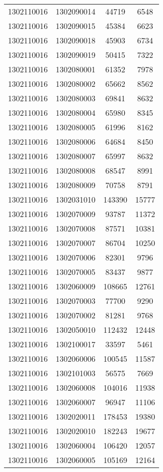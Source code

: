 \begin{longtable}[h]{llcc}
		1302110016 & 1302090014 & 44719 & 6548\\
		1302110016 & 1302090015 & 45384 & 6623\\
		1302110016 & 1302090018 & 45903 & 6734\\
		1302110016 & 1302090019 & 50415 & 7322\\
		1302110016 & 1302080001 & 61352 & 7978\\
		1302110016 & 1302080002 & 65662 & 8562\\
		1302110016 & 1302080003 & 69841 & 8632\\
		1302110016 & 1302080004 & 65980 & 8345\\
		1302110016 & 1302080005 & 61996 & 8162\\
		1302110016 & 1302080006 & 64684 & 8450\\
		1302110016 & 1302080007 & 65997 & 8632\\
		1302110016 & 1302080008 & 68547 & 8991\\
		1302110016 & 1302080009 & 70758 & 8791\\
		1302110016 & 1302031010 & 143390 & 15777\\
		1302110016 & 1302070009 & 93787 & 11372\\
		1302110016 & 1302070008 & 87571 & 10381\\
		1302110016 & 1302070007 & 86704 & 10250\\
		1302110016 & 1302070006 & 82301 & 9796\\
		1302110016 & 1302070005 & 83437 & 9877\\
		1302110016 & 1302060009 & 108665 & 12761\\
		1302110016 & 1302070003 & 77700 & 9290\\
		1302110016 & 1302070002 & 81281 & 9768\\
		1302110016 & 1302050010 & 112432 & 12448\\
		1302110016 & 1302100017 & 33597 & 5461\\
		1302110016 & 1302060006 & 100545 & 11587\\
		1302110016 & 1302101003 & 56575 & 7669\\
		1302110016 & 1302060008 & 104016 & 11938\\
		1302110016 & 1302060007 & 96947 & 11106\\
		1302110016 & 1302020011 & 178453 & 19380\\
		1302110016 & 1302020010 & 182243 & 19677\\
		1302110016 & 1302060004 & 106420 & 12057\\
		1302110016 & 1302060005 & 105169 & 12164\\

\end{longtable}
